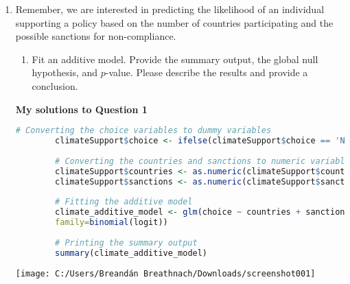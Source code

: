 \documentclass[12pt,letterpaper]{article}
\begin{document}
\begin{enumerate}
	\item
	Remember, we are interested in predicting the likelihood of an individual supporting a policy based on the number of countries participating and the possible sanctions for non-compliance.
	\begin{enumerate}
		\item [] Fit an additive model. Provide the summary output, the global null hypothesis, and $p$-value. Please describe the results and provide a conclusion.
	\end{enumerate}
	\vspace{.5cm}
	\textbf{My solutions to Question 1}
	\vspace{.25cm}
	\begin{lstlisting}[language=R]	
		# Converting the choice variables to dummy variables
		climateSupport$choice <- ifelse(climateSupport$choice == 'Not supported', 0, 1)
		
		# Converting the countries and sanctions to numeric variables
		climateSupport$countries <- as.numeric(climateSupport$countries)
		climateSupport$sanctions <- as.numeric(climateSupport$sanctions)
		
		# Fitting the additive model
		climate_additive_model <- glm(choice ~ countries + sanctions, data = climateSupport, 
		family=binomial(logit))
		
		# Printing the summary output
		summary(climate_additive_model)\end{lstlisting}
	\vspace{.5cm}
	\texttt{[image: C:/Users/Breandán Breathnach/Downloads/screenshot001]}
		\label{fig:R Studio output of summary information}
	\vspace{.5cm}
	

\end{enumerate}
\end{document}
